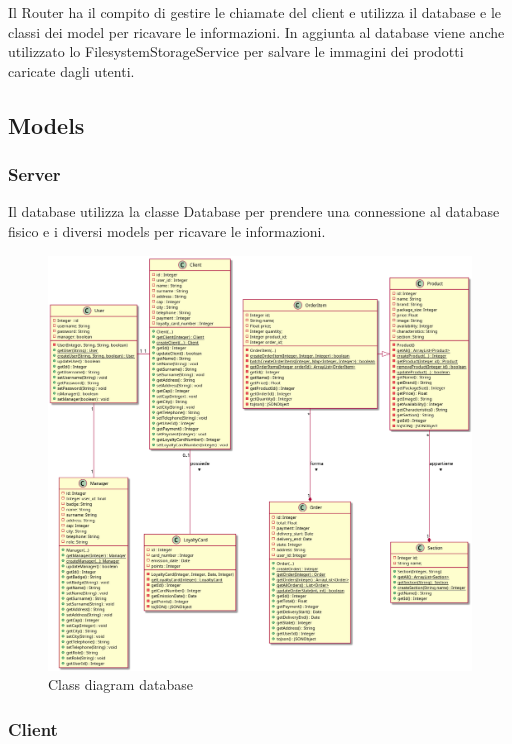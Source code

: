 \documentclass[12pt, a4paper]{report}
\begin{document}
Il Router ha il compito di gestire le chiamate del client e utilizza il
database e le classi dei model per ricavare le informazioni. In aggiunta al
database viene anche utilizzato lo FilesystemStorageService per salvare le
immagini dei prodotti caricate dagli utenti.

\newpage

\subsection{Models}

\subsubsection{Server}

Il database utilizza la classe Database per prendere una con\-nes\-sio\-ne al
da\-ta\-ba\-se fisico e i diversi models per ricavare le informazioni.

\begin{figure}[hb]
  \centering
  \includegraphics[width=\textwidth]{database_models_class.png}
  \caption{Class diagram database}
\end{figure}

\newpage

\subsubsection{Client}
\end{document}
